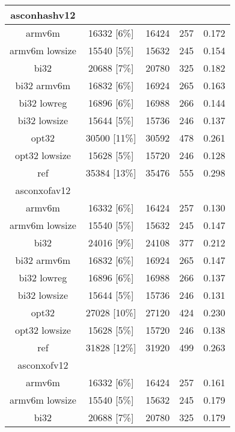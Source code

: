 \begin{table}[h]
\begin{tabular}{|c|c|c|c|c|}
        \hline
        asconhashv12 & & & & \\
        \hline
        armv6m & 16332 [6\%] & 16424 & 257 & 0.172 \\
        \hline
        armv6m lowsize & 15540 [5\%] & 15632 & 245 & 0.154 \\
        \hline
        bi32 & 20688 [7\%] & 20780 & 325 & 0.182 \\
        \hline
        bi32 armv6m & 16832 [6\%] & 16924 & 265 & 0.163 \\
        \hline
        bi32 lowreg & 16896 [6\%] & 16988 & 266 & 0.144 \\
        \hline
        bi32 lowsize & 15644 [5\%] & 15736 & 246 & 0.137 \\
        \hline
        opt32 & 30500 [11\%] & 30592 & 478 & 0.261 \\
        \hline
        opt32 lowsize & 15628 [5\%] & 15720 & 246 & 0.128 \\
        \hline
        ref & 35384 [13\%] & 35476 & 555 & 0.298 \\
        \hline
        asconxofav12 & & & & \\
        \hline
        armv6m & 16332 [6\%] & 16424 & 257 & 0.130 \\
        \hline
        armv6m lowsize & 15540 [5\%] & 15632 & 245 & 0.147 \\
        \hline
        bi32 & 24016 [9\%] & 24108 & 377 & 0.212 \\
        \hline
        bi32 armv6m & 16832 [6\%] & 16924 & 265 & 0.147 \\
        \hline
        bi32 lowreg & 16896 [6\%] & 16988 & 266 & 0.137 \\
        \hline
        bi32 lowsize & 15644 [5\%] & 15736 & 246 & 0.131 \\
        \hline
        opt32 & 27028 [10\%] & 27120 & 424 & 0.230 \\
        \hline
        opt32 lowsize & 15628 [5\%] & 15720 & 246 & 0.138 \\
        \hline
        ref & 31828 [12\%] & 31920 & 499 & 0.263 \\
        \hline
        asconxofv12 & & & & \\
        \hline
        armv6m & 16332 [6\%] & 16424 & 257 & 0.161 \\
        \hline
        armv6m lowsize & 15540 [5\%] & 15632 & 245 & 0.179 \\
        \hline
        bi32 & 20688 [7\%] & 20780 & 325 & 0.179 \\

\end{tabular}
\end{table}
